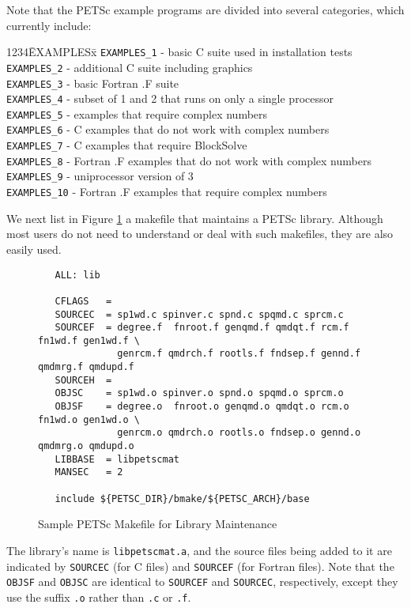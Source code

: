 Note that the PETSc example programs are divided into several
categories, which currently include: 
\begin{tabbing}
1234\= EXAMPLESx\= \kill
\> {\tt EXAMPLES\_1} \> - basic C suite used in installation tests\\
\> {\tt EXAMPLES\_2} \> - additional C suite including graphics\\
\> {\tt EXAMPLES\_3} \> - basic Fortran .F suite\\
\> {\tt EXAMPLES\_4} \> - subset of 1 and 2 that runs on only a single processor\\
\> {\tt EXAMPLES\_5} \> - examples that require complex numbers\\
\> {\tt EXAMPLES\_6} \> - C examples that do not work with complex numbers\\
\> {\tt EXAMPLES\_7} \> - C examples that require BlockSolve\\
\> {\tt EXAMPLES\_8} \> - Fortran .F examples that do not work with complex numbers\\
\> {\tt EXAMPLES\_9} \> - uniprocessor version of 3\\
\> {\tt EXAMPLES\_10} \> - Fortran .F examples that require complex numbers\\
\end{tabbing}

We next list in Figure \ref{fig:make3} a makefile that maintains a PETSc 
library.  Although most users do not need to understand or deal with such
makefiles, they are also easily used.

\begin{figure}[H]
{\small
\begin{verbatim}
   ALL: lib

   CFLAGS   =  
   SOURCEC  = sp1wd.c spinver.c spnd.c spqmd.c sprcm.c
   SOURCEF  = degree.f  fnroot.f genqmd.f qmdqt.f rcm.f fn1wd.f gen1wd.f \
              genrcm.f qmdrch.f rootls.f fndsep.f gennd.f qmdmrg.f qmdupd.f
   SOURCEH  = 
   OBJSC    = sp1wd.o spinver.o spnd.o spqmd.o sprcm.o
   OBJSF    = degree.o  fnroot.o genqmd.o qmdqt.o rcm.o fn1wd.o gen1wd.o \
              genrcm.o qmdrch.o rootls.o fndsep.o gennd.o qmdmrg.o qmdupd.o
   LIBBASE  = libpetscmat
   MANSEC   = 2

   include ${PETSC_DIR}/bmake/${PETSC_ARCH}/base
\end{verbatim}
}
\caption{Sample PETSc Makefile for Library Maintenance}
\label{fig:make3}
\end{figure}

The library's name is {\tt libpetscmat.a}, and the source files being added
to it are indicated by {\tt SOURCEC} (for C files) and {\tt SOURCEF} (for 
Fortran files). Note that the {\tt OBJSF} and {\tt OBJSC} are identical 
to {\tt SOURCEF} and {\tt SOURCEC}, respectively, except they use the
suffix {\tt .o} rather than {\tt .c} or {\tt .f}. 

